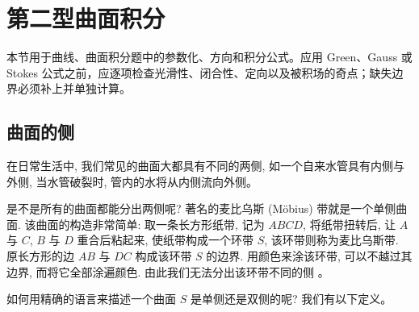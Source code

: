\documentclass[UTF8,12pt,a4paper,fontset=fandol]{ctexart}
\begin{document}
\section{第二型曲面积分}\label{course-16-4}
本节用于曲线、曲面积分题中的参数化、方向和积分公式。应用 Green、Gauss 或 Stokes 公式之前，应逐项检查光滑性、闭合性、定向以及被积场的奇点；缺失边界必须补上并单独计算。

\subsection{曲面的侧}

在日常生活中, 我们常见的曲面大都具有不同的两侧, 如一个自来水管具有内侧与外侧, 当水管破裂时, 管内的水将从内侧流向外侧。

是不是所有的曲面都能分出两侧呢? 著名的麦比乌斯 (Möbius) 带就是一个单侧曲面. 该曲面的构造非常简单: 取一条长方形纸带, 记为 $ABCD$, 将纸带扭转后, 让 $A$ 与 $C$, $B$ 与 $D$ 重合后粘起来, 使纸带构成一个环带 $S$, 该环带则称为麦比乌斯带. 原长方形的边 $AB$ 与 $DC$ 构成该环带 $S$ 的边界. 用颜色来涂该环带, 可以不越过其边界, 而将它全部涂遍颜色. 由此我们无法分出该环带不同的侧 。

如何用精确的语言来描述一个曲面 $S$ 是单侧还是双侧的呢? 我们有以下定义。
\end{document}
